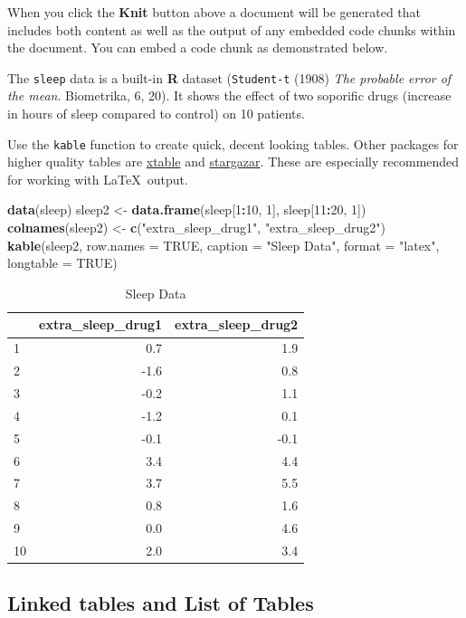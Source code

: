 \documentclass[12pt,oneside]{chicagocapstone}
\newenvironment{Shaded}{\begin{snugshade}}{\end{snugshade}}
\newcommand{\DataTypeTok}[1]{\textcolor[rgb]{0.13,0.29,0.53}{#1}}
\newcommand{\DecValTok}[1]{\textcolor[rgb]{0.00,0.00,0.81}{#1}}
\newcommand{\KeywordTok}[1]{\textcolor[rgb]{0.13,0.29,0.53}{\textbf{#1}}}
\newcommand{\NormalTok}[1]{#1}
\newcommand{\OperatorTok}[1]{\textcolor[rgb]{0.81,0.36,0.00}{\textbf{#1}}}
\newcommand{\OtherTok}[1]{\textcolor[rgb]{0.56,0.35,0.01}{#1}}
\newcommand{\StringTok}[1]{\textcolor[rgb]{0.31,0.60,0.02}{#1}}
\begin{document}
When you click the \textbf{Knit} button above a document will be generated that includes both content as well as the output of any embedded code chunks within the document. You can embed a code chunk as demonstrated below.

The \texttt{sleep} data is a built-in \textbf{R} dataset (\texttt{Student-t} (1908) \emph{The probable error of the mean}. Biometrika, 6, 20). It shows the effect of two soporific drugs (increase in hours of sleep compared to control) on 10 patients.

Use the \texttt{kable} function to create quick, decent looking tables. Other packages for higher quality tables are \href{https://cran.r-project.org/web/packages/xtable/index.html}{xtable} and \href{https://cran.r-project.org/web/packages/stargazer/index.html}{stargazar}. These are especially recommended for working with \LaTeX~output.
\begin{Shaded}
\begin{Highlighting}[]
\KeywordTok{data}\NormalTok{(sleep)}
\NormalTok{sleep2 <-}\StringTok{ }\KeywordTok{data.frame}\NormalTok{(sleep[}\DecValTok{1}\OperatorTok{:}\DecValTok{10}\NormalTok{, }\DecValTok{1}\NormalTok{], sleep[}\DecValTok{11}\OperatorTok{:}\DecValTok{20}\NormalTok{, }\DecValTok{1}\NormalTok{])}
\KeywordTok{colnames}\NormalTok{(sleep2) <-}\StringTok{ }\KeywordTok{c}\NormalTok{(}\StringTok{"extra_sleep_drug1"}\NormalTok{, }\StringTok{"extra_sleep_drug2"}\NormalTok{)}
\KeywordTok{kable}\NormalTok{(sleep2, }\DataTypeTok{row.names =} \OtherTok{TRUE}\NormalTok{, }\DataTypeTok{caption =} \StringTok{"Sleep Data"}\NormalTok{, }
              \DataTypeTok{format =} \StringTok{"latex"}\NormalTok{, }\DataTypeTok{longtable =} \OtherTok{TRUE}\NormalTok{)}
\end{Highlighting}
\end{Shaded}
\begin{longtable}[t]{l|r|r}
\caption{\label{tab:sleep}Sleep Data}\\
\hline
  & extra\_sleep\_drug1 & extra\_sleep\_drug2\\
\hline
1 & 0.7 & 1.9\\
\hline
2 & -1.6 & 0.8\\
\hline
3 & -0.2 & 1.1\\
\hline
4 & -1.2 & 0.1\\
\hline
5 & -0.1 & -0.1\\
\hline
6 & 3.4 & 4.4\\
\hline
7 & 3.7 & 5.5\\
\hline
8 & 0.8 & 1.6\\
\hline
9 & 0.0 & 4.6\\
\hline
10 & 2.0 & 3.4\\
\hline
\end{longtable}
\hypertarget{linked-tables-and-list-of-tables}{%
\subsection*{Linked tables and List of Tables}\label{linked-tables-and-list-of-tables}}
\end{document}
